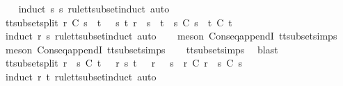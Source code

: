 \begin{isabellebody}
%
\isadelimproof
\ \ %
\endisadelimproof
%
\isatagproof
{}\isamarkupfalse%
\ {\isacharparenleft}induct\ s{\isacharprime}\ s\ rule{\isacharcolon}tt{\isacharunderscore}subset{\isachardot}induct{\isacharcomma}\ auto{\isacharparenright}%
\endisatagproof
{\isafoldproof}%
%
\isadelimproof
\ \ \ \isanewline
%
\endisadelimproof
\isanewline
{}\isamarkupfalse%
\ tt{\isacharunderscore}subset{\isacharunderscore}split{\isacharcolon}\ {\isachardoublequoteopen}r\ {\isasymsubseteq}\isactrlsub C\ s\ {\isacharat}\ t\ {\isasymLongrightarrow}\ {\isasymexists}\ s{\isacharprime}\ t{\isacharprime}{\isachardot}\ r\ {\isacharequal}\ s{\isacharprime}\ {\isacharat}\ t{\isacharprime}\ {\isasymand}\ s{\isacharprime}\ {\isasymsubseteq}\isactrlsub C\ s\ {\isasymand}\ t{\isacharprime}\ {\isasymsubseteq}\isactrlsub C\ t{\isachardoublequoteclose}\isanewline
%
\isadelimproof
\ \ %
\endisadelimproof
%
\isatagproof
{}\isamarkupfalse%
\ {\isacharparenleft}induct\ r\ s\ rule{\isacharcolon}tt{\isacharunderscore}subset{\isachardot}induct{\isacharcomma}\ auto{\isacharparenright}\isanewline
\ \ \isamarkupfalse%
\ {\isacharparenleft}meson\ Cons{\isacharunderscore}eq{\isacharunderscore}appendI\ tt{\isacharunderscore}subset{\isachardot}simps{\isacharparenleft}{}{\isacharparenright}{\isacharparenright}\isanewline
\ \ \isamarkupfalse%
\ {\isacharparenleft}meson\ Cons{\isacharunderscore}eq{\isacharunderscore}appendI\ tt{\isacharunderscore}subset{\isachardot}simps{\isacharparenleft}{}{\isacharparenright}{\isacharparenright}\isanewline
\ \ \isamarkupfalse%
\ tt{\isacharunderscore}subset{\isachardot}simps{\isacharparenleft}{}{\isacharparenright}\ \isamarkupfalse%
\ blast{\isacharplus}%
\endisatagproof
{\isafoldproof}%
%
\isadelimproof
\isanewline
%
\endisadelimproof
\isanewline
{}\isamarkupfalse%
\ tt{\isacharunderscore}subset{\isacharunderscore}split{}{\isacharcolon}\ {\isachardoublequoteopen}r\ {\isacharat}\ s\ {\isasymsubseteq}\isactrlsub C\ t\ {\isasymLongrightarrow}\ {\isasymexists}\ r{\isacharprime}\ s{\isacharprime}{\isachardot}\ t\ {\isacharequal}\ \ r{\isacharprime}\ {\isacharat}\ \ s{\isacharprime}\ {\isasymand}\ r\ {\isasymsubseteq}\isactrlsub C\ r{\isacharprime}\ {\isasymand}\ s\ {\isasymsubseteq}\isactrlsub C\ s{\isacharprime}{\isachardoublequoteclose}\isanewline
%
\isadelimproof
\ \ %
\endisadelimproof
%
\isatagproof
{}\isamarkupfalse%
\ {\isacharparenleft}induct\ r\ t\ rule{\isacharcolon}tt{\isacharunderscore}subset{\isachardot}induct{\isacharcomma}\ auto{\isacharparenright}\isanewline

\end{isabellebody}
